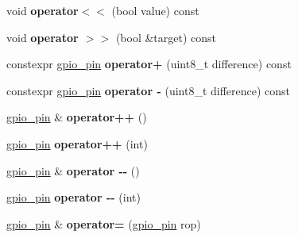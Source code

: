 \begin{DoxyCompactItemize}
void {\bfseries operator$<$$<$} (bool value) const
\item 
\mbox{\label{classfsl_1_1hw_1_1gpio__pin_acaa0c9154c62c5ff601f67e217cd9855}} 
void {\bfseries operator $>$$>$} (bool \&target) const
\item 
\mbox{\label{classfsl_1_1hw_1_1gpio__pin_a9a01da097c8e07d50a6f92f21130389a}} 
constexpr \mbox{\hyperlink{classfsl_1_1hw_1_1gpio__pin}{gpio\+\_\+pin}} {\bfseries operator+} (uint8\+\_\+t difference) const
\item 
\mbox{\label{classfsl_1_1hw_1_1gpio__pin_a8597dc1532515d0fef60cdbb9570e835}} 
constexpr \mbox{\hyperlink{classfsl_1_1hw_1_1gpio__pin}{gpio\+\_\+pin}} {\bfseries operator -\/} (uint8\+\_\+t difference) const
\item 
\mbox{\label{classfsl_1_1hw_1_1gpio__pin_a6e65037ab636e7f6223f90aee5f80fd3}} 
\mbox{\hyperlink{classfsl_1_1hw_1_1gpio__pin}{gpio\+\_\+pin}} \& {\bfseries operator++} ()
\item 
\mbox{\label{classfsl_1_1hw_1_1gpio__pin_a6e4e9b13b8be04de01fd5e0a25cd67bb}} 
\mbox{\hyperlink{classfsl_1_1hw_1_1gpio__pin}{gpio\+\_\+pin}} {\bfseries operator++} (int)
\item 
\mbox{\label{classfsl_1_1hw_1_1gpio__pin_ab63de63b1e55bf9afb3502ba0cd72ca9}} 
\mbox{\hyperlink{classfsl_1_1hw_1_1gpio__pin}{gpio\+\_\+pin}} \& {\bfseries operator -\/-\/} ()
\item 
\mbox{\label{classfsl_1_1hw_1_1gpio__pin_a8a6d5e76940900a92605f129114d9661}} 
\mbox{\hyperlink{classfsl_1_1hw_1_1gpio__pin}{gpio\+\_\+pin}} {\bfseries operator -\/-\/} (int)
\item 
\mbox{\label{classfsl_1_1hw_1_1gpio__pin_aca66c38840faefd506d53c5c1b64a1e3}} 
\mbox{\hyperlink{classfsl_1_1hw_1_1gpio__pin}{gpio\+\_\+pin}} \& {\bfseries operator=} (\mbox{\hyperlink{classfsl_1_1hw_1_1gpio__pin}{gpio\+\_\+pin}} rop)
\item 
\mbox{\label{classfsl_1_1hw_1_1gpio__pin_a0134231a446dce5a49d04bbde5e98ee2}} 

\end{DoxyCompactItemize}

